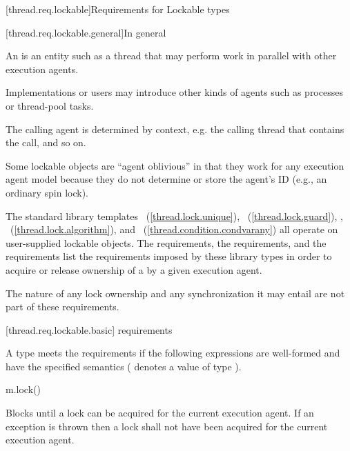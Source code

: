 [thread.req.lockable]{Requirements for Lockable types}

[thread.req.lockable.general]{In general}

\pnum
An  is an entity such as a thread that may perform work in parallel with
other execution agents. \begin{note} Implementations or users may introduce other kinds of
agents such as processes or thread-pool tasks. \end{note} The calling agent is determined by
context, e.g. the calling thread that contains the call, and so on.

\pnum
\begin{note} Some lockable objects are ``agent oblivious'' in that they work for any
execution agent model because they do not determine or store the agent's ID (e.g., an
ordinary spin lock). \end{note}

\pnum
The standard library templates ~(\ref{thread.lock.unique}),
~(\ref{thread.lock.guard}), ,
~(\ref{thread.lock.algorithm}), and
~(\ref{thread.condition.condvarany}) all operate on user-supplied
lockable objects. The  requirements, the  requirements,
and the  requirements list the requirements imposed by these library types
in order to acquire or release ownership of a  by a given execution agent.
\begin{note} The nature of any lock ownership and any synchronization it may entail are not part
of these requirements. \end{note}

[thread.req.lockable.basic]{ requirements}

\pnum
A type  meets the  requirements if the following expressions are
well-formed and have the specified semantics ( denotes a value of type ).

\begin{itemdecl}
m.lock()
\end{itemdecl}

\begin{itemdescr}
\pnum
\effects Blocks until a lock can be acquired for the current execution agent. If an exception
is thrown then a lock shall not have been acquired for the current execution agent.
\end{itemdescr}

